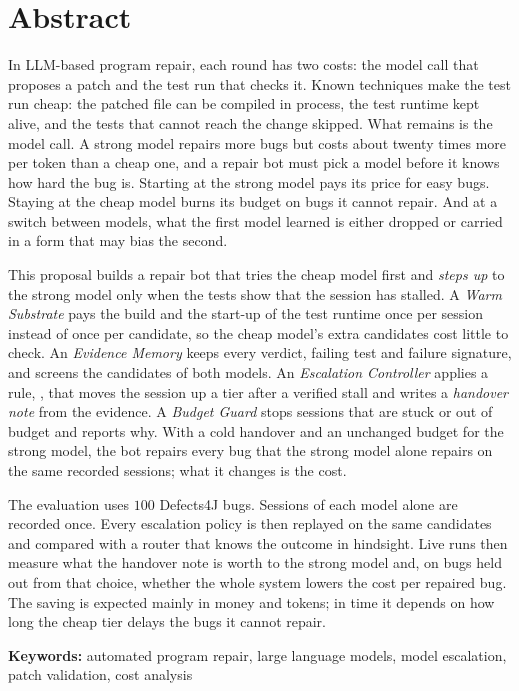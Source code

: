 \chapter*{Abstract}

In LLM-based program repair, each round has two costs: the model call that
proposes a patch and the test run that checks it. Known techniques make the
test run cheap: the patched file can be compiled in process, the test runtime
kept alive, and the tests that cannot reach the change skipped. What remains is
the model call. A strong model repairs more bugs but costs about twenty times
more per token than a cheap one, and a repair bot must pick a model before it
knows how hard the bug is. Starting at the strong model pays its price for easy
bugs. Staying at the cheap model burns its budget on bugs it cannot repair. And
at a switch between models, what the first model learned is either dropped or
carried in a form that may bias the second.

This proposal builds a repair bot that tries the cheap model first and
\emph{steps up} to the strong model only when the tests show that the session
has stalled. A \emph{Warm Substrate} pays the build and the start-up of the
test runtime once per session instead of once per candidate, so the cheap
model's extra candidates cost little to check. An \emph{Evidence Memory} keeps
every verdict, failing test and failure signature, and screens the candidates
of both models. An \emph{Escalation Controller} applies a rule, \Step, that
moves the session up a tier after a verified stall and writes a \emph{handover
note} from the evidence. A \emph{Budget Guard} stops sessions that are stuck or
out of budget and reports why. With a cold handover and an unchanged budget for
the strong model, the bot repairs every bug that the strong model alone repairs
on the same recorded sessions; what it changes is the cost.

The evaluation uses $100$ Defects4J bugs. Sessions of each model alone are
recorded once. Every escalation policy is then replayed on the same candidates
and compared with a router that knows the outcome in hindsight. Live runs then
measure what the handover note is worth to the strong model and, on bugs held
out from that choice, whether the whole system lowers the cost per repaired
bug. The saving is expected mainly in money and tokens; in time it depends on
how long the cheap tier delays the bugs it cannot repair.

\vspace{1em}
\noindent\textbf{Keywords:} automated program repair, large language models,
model escalation, patch validation, cost analysis

